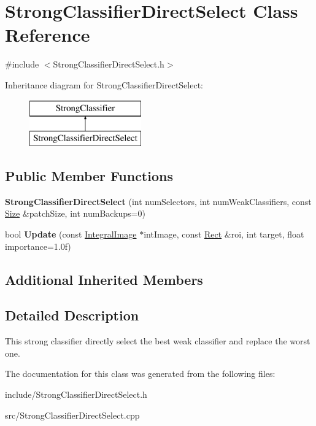 \hypertarget{classStrongClassifierDirectSelect}{}\section{Strong\+Classifier\+Direct\+Select Class Reference}
\label{classStrongClassifierDirectSelect}


{\ttfamily \#include $<$Strong\+Classifier\+Direct\+Select.\+h$>$}

Inheritance diagram for Strong\+Classifier\+Direct\+Select\+:\begin{figure}[H]
\begin{center}
\leavevmode
\includegraphics[height=2.000000cm]{classStrongClassifierDirectSelect}
\end{center}
\end{figure}
\subsection*{Public Member Functions}
\begin{DoxyCompactItemize}
\item 
\hypertarget{classStrongClassifierDirectSelect_a9e22d3f25ce43d6f2e3234d502b71df1}{}{\bfseries Strong\+Classifier\+Direct\+Select} (int num\+Selectors, int num\+Weak\+Classifiers, const \hyperlink{classSize}{Size} \&patch\+Size, int num\+Backups=0)\label{classStrongClassifierDirectSelect_a9e22d3f25ce43d6f2e3234d502b71df1}

\item 
\hypertarget{classStrongClassifierDirectSelect_a70f5944801a3023fb52e5f69028c76eb}{}bool {\bfseries Update} (const \hyperlink{classIntegralImage}{Integral\+Image} $\ast$int\+Image, const \hyperlink{classRect}{Rect} \&roi, int target, float importance=1.\+0f)\label{classStrongClassifierDirectSelect_a70f5944801a3023fb52e5f69028c76eb}

\end{DoxyCompactItemize}
\subsection*{Additional Inherited Members}


\subsection{Detailed Description}
This strong classifier directly select the best weak classifier and replace the worst one. 

The documentation for this class was generated from the following files\+:\begin{DoxyCompactItemize}
\item 
include/Strong\+Classifier\+Direct\+Select.\+h\item 
src/Strong\+Classifier\+Direct\+Select.\+cpp\end{DoxyCompactItemize}

